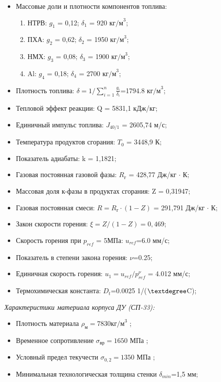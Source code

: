\begin{itemize}
	\item Массовые доли и плотности компонентов топлива:
	\begin{enumerate}[1.]
		\item НТРВ:  		$g_1$ = 0,12; 		$\delta_1$ = 920  $\text{кг/м}^3$;
		\item ПХА:			$g_2$ = 0,62;		$\delta_2$ = 1950 $\text{кг/м}^3$;
		\item НМХ:			$g_3$ = 0,08;		$\delta_3$ = 1900 $\text{кг/м}^3$;
		\item Al:			$g_4$ = 0,18;		$\delta_4$ = 2700 $\text{кг/м}^3$;
	\end{enumerate}
	\item Плотность топлива:			$\delta=1/\sum_{i=1}^n \frac{g_i}{\delta_i} $=1794.8  $\text{кг/м}^3$;
	\item Тепловой эффект реакции:				Q = 5831,1 кДж/кг;
	\item Единичный импульс топлива:				$J_{40/1}$ = 2605,74 м/с;
	\item Температура продуктов сгорания:			$T_0$ = 3448,9 К;
	\item Показатель адиабаты:					k = 1,1821;
	\item Газовая постоянная газовой фазы:			$R_\text{г}$ = 428,77 Дж/кг $\cdot$ К;
	\item Массовая доля к-фазы в продуктах сгорания:	Z = 0,31947;
	\item Газовая постоянная смеси:		$R = R_\text{г}\cdot(1−Z)$ = 291,791 Дж/кг $\cdot$ К;
	\item Закон скорости горения:	$\xi=Z/(1-Z)=0,469$;
	\item Скорость горения при $p_{ref}$ = 5МПа:	$	u_{ref}$=6.0  мм/с;
	\item Показатель в степени закона горения:		$\nu$=0.25;
	\item Единичная скорость горения: $u_1=u_{ref} / p_{ref}^\nu$ = 4.012  мм/с;
	\item Термохимическая константа:				$D_t$=0.0025  1/($\textdegree$C);
\end{itemize}

\emph{Характеристики материала корпуса ДУ (СП-33):}

\begin{itemize}
	\item Плотность материала					$\rho_\text{м}=7830  \text{кг/м}^3$ ;
	\item Временное сопротивление				$\sigma_\text{вр}=1650$ МПа ;
	\item Условный предел текучести			$\sigma_{0,2}=1350$ МПа ;
	\item Минимальная технологическая толщина стенки	$\delta_{min}$=1,5 мм;
\end{itemize}


